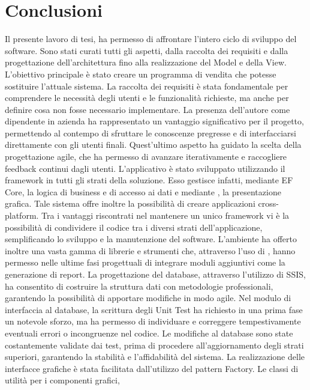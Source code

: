\chapter{Conclusioni}
Il presente lavoro di tesi, ha permesso di affrontare l'intero ciclo
di sviluppo del software. Sono stati curati tutti gli aspetti,
dalla raccolta dei requisiti e dalla progettazione dell'architettura fino alla
realizzazione del Model e della View.
L'obiettivo principale è stato creare un programma
di vendita che potesse sostituire l'attuale sistema. La raccolta dei requisiti è stata fondamentale per comprendere
le necessità degli utenti e le funzionalità richieste, ma
anche per definire cosa non fosse necessario implementare. La presenza dell'autore come
dipendente in azienda ha rappresentato un vantaggio
significativo per il progetto, permettendo al contempo di sfruttare le conoscenze
pregresse e di interfacciarsi direttamente con gli utenti finali.
Quest'ultimo aspetto ha guidato la scelta della progettazione agile,
che ha permesso di avanzare iterativamente e raccogliere feedback continui dagli utenti.
L'applicativo è stato sviluppato utilizzando il framework
\dotnet{} in tutti gli strati della soluzione. Esso gestisce infatti, mediante \ac{EF Core},
la logica di business e di accesso ai dati e mediante \maui{},
la presentazione grafica.
Tale sistema offre inoltre la possibilità di creare applicazioni cross-platform.
Tra i vantaggi riscontrati nel mantenere un unico framework vi è la possibilità
di condividere il codice tra i diversi strati dell'applicazione,
semplificando lo sviluppo e la manutenzione del software. L'ambiente \dotnet{} ha offerto inoltre una vasta
gamma di librerie e strumenti che,
attraverso l'uso di \nuget{}, hanno permesso nelle ultime fasi progettuali di
integrare moduli aggiuntivi come la generazione di report. La progettazione del database, attraverso l'utilizzo di \ac{SSIS},
ha consentito di costruire la struttura dati con metodologie professionali,
garantendo la possibilità di apportare modifiche in modo agile.
Nel modulo di interfaccia al database, la scrittura degli Unit Test
ha richiesto in una prima fase un notevole sforzo, ma ha permesso di individuare
e correggere tempestivamente eventuali errori o incongruenze nel codice.
Le modifiche al database sono state costantemente validate dai test, prima
di procedere all'aggiornamento degli strati superiori, garantendo la stabilità e
l'affidabilità del sistema. La realizzazione delle interfacce grafiche è stata
facilitata dall'utilizzo del pattern Factory. Le classi di utilità per i componenti grafici,
